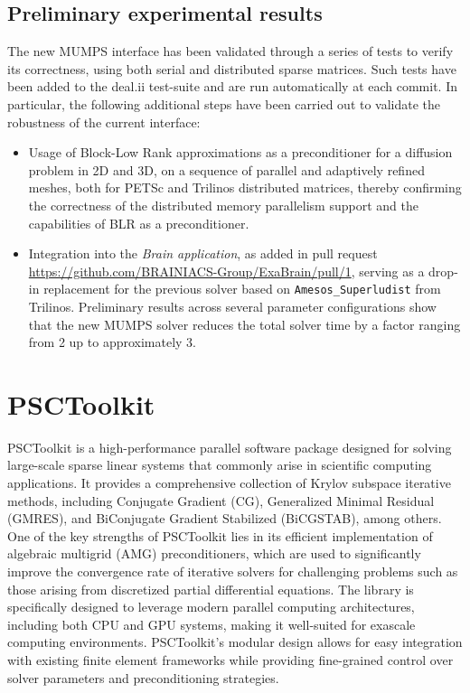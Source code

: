 \documentclass[a4paper,12pt]{article}
\begin{document}
\subsection{Preliminary experimental results}
The new MUMPS interface has been validated through a series of tests
to verify its correctness, using both serial and distributed sparse matrices. Such tests
have been added to the deal.ii test-suite and are run automatically at
each commit. In particular, the following additional steps have
been carried out to validate the robustness of the current interface:
\begin{itemize}
    \item Usage of Block-Low Rank approximations as a preconditioner
          for a diffusion problem in 2D and 3D, on a sequence of parallel and
          adaptively refined meshes, both for PETSc and Trilinos distributed matrices, thereby
          confirming the correctness of the distributed memory parallelism
          support and the capabilities of BLR as a preconditioner.
    \item Integration into the \emph{Brain application}, as added
          in pull request \url{https://github.com/BRAINIACS-Group/ExaBrain/pull/1}, serving as a
          drop-in replacement for the previous solver based on \texttt{Amesos\_Superludist}
          from Trilinos. Preliminary results across several
          parameter configurations show that the new MUMPS solver
          reduces the total solver time by a factor
          ranging from 2 up to approximately 3.

\end{itemize}
\newpage

\section{PSCToolkit}
\label{sec:section3}

PSCToolkit is a high-performance parallel software package designed for solving large-scale sparse linear 
systems that commonly arise in scientific computing applications. It provides a comprehensive collection 
of Krylov subspace iterative methods, including Conjugate Gradient (CG), Generalized Minimal Residual (GMRES), 
and BiConjugate Gradient Stabilized (BiCGSTAB), among others. One of the key strengths of PSCToolkit lies 
in its efficient implementation of algebraic multigrid (AMG) preconditioners, which are used to significantly 
improve the convergence rate of iterative solvers for challenging problems such as those arising from 
discretized partial differential equations. The library is specifically designed to leverage modern 
parallel computing architectures, including both CPU and GPU systems, making it well-suited for exascale 
computing environments. PSCToolkit's modular design allows for easy integration with existing finite element 
frameworks while providing fine-grained control over solver parameters and preconditioning strategies.
\end{document}
